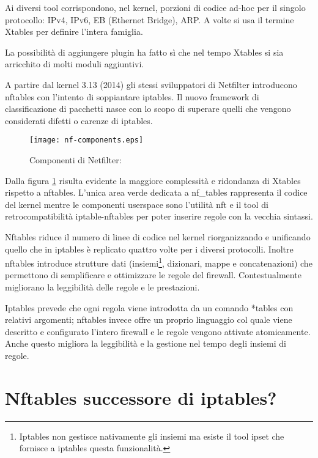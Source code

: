 Ai diversi tool corrispondono, nel kernel, porzioni di codice ad-hoc per il
singolo protocollo: IPv4, IPv6, EB (Ethernet Bridge), ARP.  A volte si usa
il termine Xtables per definire l'intera famiglia.

La possibilità di aggiungere plugin ha fatto s\`i che nel tempo Xtables si
sia arricchito di molti moduli aggiuntivi.

A partire dal kernel 3.13 (2014) gli stessi sviluppatori di Netfilter
introducono nftables con l'intento
di soppiantare iptables.  Il nuovo framework di classificazione di pacchetti
nasce con lo scopo di superare quelli che vengono considerati difetti o
carenze di iptables.
\begin{figure}[H]
    \texttt{[image: nf-components.eps]}
    \caption[Componenti di Netfilter]{Componenti di Netfilter:\footnotemark}
    \label{fig:netfilter}
\end{figure}
\noindent Dalla figura \ref{fig:netfilter} risulta evidente la maggiore complessità e
%
ridondanza di Xtables rispetto a nftables. L'unica area verde dedicata a
nf\_tables rappresenta il codice del kernel mentre le componenti userspace
sono l'utilità nft e il tool di retrocompatibilità iptable-nftables per poter
inserire regole con la vecchia sintassi.

Nftables riduce il numero di linee di codice nel kernel riorganizzando e
unificando quello che in iptables è replicato quattro volte per i diversi protocolli.
Inoltre nftables introduce strutture dati (insiemi\footnote{Iptables non
    gestisce nativamente gli insiemi ma esiste il tool ipset che fornisce a
iptables questa funzionalità.}, dizionari, mappe e concatenazioni) che permettono di
semplificare e ottimizzare le regole del firewall. Contestualmente migliorano la
leggibilità delle regole e le prestazioni.

Iptables prevede che ogni regola viene introdotta da un comando *tables con
relativi argomenti; nftables invece offre un proprio linguaggio col quale
viene descritto e configurato l'intero firewall e le regole vengono attivate
atomicamente. Anche questo migliora la leggibilit\`a e la gestione nel tempo
degli insiemi di regole.

\section{Nftables successore di iptables?}

